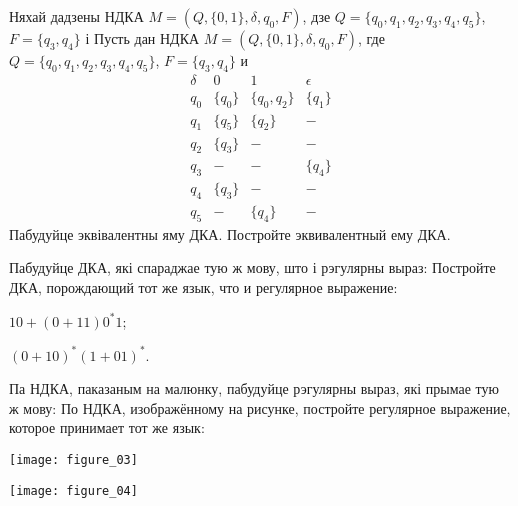 \documentclass[12pt, a4paper]{article}
\begin{document}
\begin{problemList}
\problemItemWithCommonPartComplicated
{Няхай дадзены НДКА $M=(Q, \{0, 1\}, \delta, q_0, F)$, дзе $Q=\{q_0, q_1, q_2, q_3, q_4, q_5\}$, $F=\{q_3, q_4\}$ і}
{Пусть дан НДКА $M=(Q, \{0, 1\}, \delta, q_0, F)$, где $Q=\{q_0, q_1, q_2, q_3, q_4, q_5\}$, $F=\{q_3, q_4\}$ и}
{%
\[
\begin{matrix}
\delta & 0 & 1 & \epsilon \\
q_0 & \{q_0\} & \{q_0, q_2\} & \{q_1\} \\
q_1 & \{q_5\} & \{q_2\} & -\\
q_2 & \{q_3\} & - & - \\
q_3 & - & - & \{q_4\} \\
q_4 & \{q_3\} & - & - \\
q_5 & - & \{q_4\} & -
\end{matrix}
\]
}
{Пабудуйце эквівалентны яму ДКА.}
{Постройте эквивалентный ему ДКА.}

\bigskip

\problemItemWithCommonPart
{Пабудуйце ДКА, які спараджае тую ж мову, што і рэгулярны выраз:}
{Постройте ДКА, порождающий тот же язык, что и регулярное выражение:}
{%
\begin{belarusianEnumerate}
    \item $10+(0+11)0^*1$;
    \item $(0+10)^*(1+01)^*$.
\end{belarusianEnumerate}
}

\smallskip

\problemItemWithCommonPart
{Па НДКА, паказаным на малюнку, пабудуйце рэгулярны выраз, які прымае тую ж мову:}
{По НДКА, изображённому на рисунке, постройте регулярное выражение, которое принимает тот же язык:}
{%
\begin{belarusianEnumerateTwocol}
    \item \texttt{[image: figure\_03]}
    \item \texttt{[image: figure\_04]}
\end{belarusianEnumerateTwocol}
}

\smallskip


\end{problemList}
\end{document}

